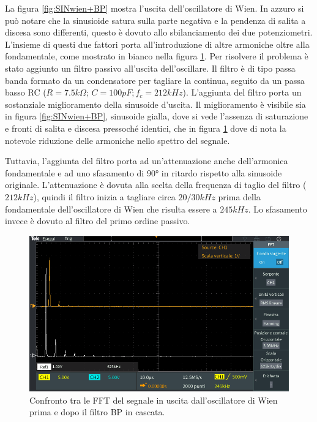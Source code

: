 \documentclass[titlepage]{report}
\begin{document}
	La figura \ref{fig:SINwien+BP} mostra l'uscita dell'oscillatore di Wien. In azzuro si può notare che la sinusioide satura sulla parte negativa e la pendenza di salita a discesa sono differenti, questo è dovuto allo sbilanciamento dei due potenziometri. L'insieme di questi due fattori porta all'introduzione di altre armoniche oltre alla fondamentale, come mostrato in bianco nella figura \ref{fig:FFTwien+BP}.
	Per risolvere il problema è stato aggiunto un filtro passivo all'uscita dell'oscillare. Il filtro è di tipo passa banda formato da un condensatore per tagliare la continua, seguito da un passa basso RC ($R = 7.5k\Omega$; $C = 100pF; f_c = 212kHz$).
	L'aggiunta del filtro porta un sostanziale miglioramento della sinusoide d'uscita. Il miglioramento è visibile sia in figura \ref{fig:SINwien+BP}, sinusoide gialla, dove si vede l'assenza di saturazione e fronti di salita e discesa pressoché identici, che in figura \ref{fig:FFTwien+BP} dove di nota la notevole riduzione delle armoniche nello spettro del segnale.

	Tuttavia, l'aggiunta del filtro porta ad un'attenuazione anche dell'armonica fondamentale e ad uno sfasamento di 90° in ritardo rispetto alla sinusoide originale. L'attenuazione è dovuta alla scelta della frequenza di taglio del filtro ($212kHz$), quindi il filtro inizia a tagliare circa $20/30kHz$ prima della fondamentale dell'oscillatore di Wien che risulta essere a $245kHz$. Lo sfasamento invece è dovuto al filtro del primo ordine passivo.

	\begin{figure}[H]
		\centering
		\includegraphics[scale=0.5]{Immagini/fft_osc+bp210k.PNG}
		\caption{Confronto tra le FFT del segnale in uscita dall'oscillatore di Wien prima e dopo il filtro BP in cascata.}
		\label{fig:FFTwien+BP}
	\end{figure}
\end{document}
